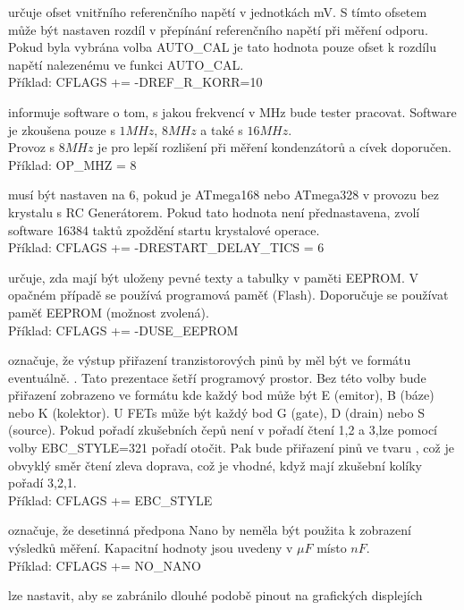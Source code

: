 \begin{description} \setlength{\itemsep}{0em}
  \item[REF\_R\_KORR] určuje ofset vnitřního referenčního napětí v jednotkách mV.
S tímto ofsetem může být nastaven rozdíl v přepínání referenčního napětí při měření odporu.
Pokud byla vybrána volba AUTO\_CAL je tato hodnota pouze ofset k rozdílu napětí nalezenému ve
funkci AUTO\_CAL.\\
Příklad: CFLAGS += -DREF\_R\_KORR=10
  \item[OP\_MHZ] informuje software o tom, s jakou frekvencí v MHz bude tester pracovat.
Software je zkoušena pouze s \(1MHz\), \(8MHz\) a také s \(16MHz\).\\ Provoz s \(8MHz\) je pro lepší rozlišení
při měření kondenzátorů a cívek doporučen.\\
Příklad: OP\_MHZ = 8
  \item[RESTART\_DELAY\_TICS] musí být nastaven na 6, pokud je ATmega168 nebo ATmega328 v provozu
bez krystalu s RC Generátorem.
Pokud tato hodnota není přednastavena, zvolí software 16384 taktů zpoždění startu krystalové operace.\\
Příklad: CFLAGS += -DRESTART\_DELAY\_TICS = 6
  \item[USE\_EEPROM] určuje, zda mají být uloženy pevné texty a tabulky v paměti EEPROM.
V opačném případě se používá programová paměť (Flash).
Doporučuje se používat paměť EEPROM (možnost zvolená).\\
Příklad: CFLAGS += -DUSE\_EEPROM
  \item[EBC\_STYLE] označuje, že výstup přiřazení tranzistorových pinů by měl být ve
formátu   eventuálně. .
Tato prezentace šetří programový prostor.
Bez této volby bude přiřazení zobrazeno ve formátu  kde každý bod může být E (emitor),
B (báze) nebo K (kolektor).
U FETs může být každý bod G (gate), D (drain) nebo S (source).
Pokud pořadí zkušebních čepů není v pořadí čtení 1,2 a 3,lze pomocí volby EBC\_STYLE=321 pořadí otočit.
Pak  bude přiřazení pinů ve tvaru , což je obvyklý směr čtení zleva doprava, což je vhodné,
 když mají zkušební kolíky pořadí 3,2,1.\\
Příklad: CFLAGS += EBC\_STYLE
  \item[NO\_NANO] označuje, že desetinná předpona Nano by neměla být použita k zobrazení výsledků měření.
Kapacitní hodnoty jsou uvedeny v \(\mu F\) místo \(nF\).\\
Příklad: CFLAGS += NO\_NANO
  \item[NO\_LONG\_PINLAYOUT] lze nastavit, aby se zabránilo dlouhé podobě pinout na grafických displejích

\end{description}
